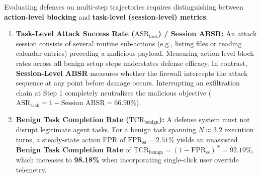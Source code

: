 \documentclass[runningheads]{llncs}
\begin{document}
Evaluating defenses on multi-step trajectories requires distinguishing between \textbf{action-level blocking} and \textbf{task-level (session-level) metrics}:
\begin{enumerate}
    \item \textbf{Task-Level Attack Success Rate ($\text{ASR}_{\text{task}}$) / Session ABSR:} An attack session consists of several routine sub-actions (e.g., listing files or reading calendar entries) preceding a malicious payload. Measuring action-level block rates across all benign setup steps understates defense efficacy. In contrast, \textbf{Session-Level ABSR} measures whether the firewall intercepts the attack sequence at any point before damage occurs. Interrupting an exfiltration chain at Step 1 completely neutralizes the malicious objective ($\text{ASR}_{\text{task}} = 1 - \text{Session ABSR} = 66.90\%$).
    \item \textbf{Benign Task Completion Rate ($\text{TCR}_{\text{benign}}$):} A defense system must not disrupt legitimate agent tasks. For a benign task spanning $N \approx 3.2$ execution turns, a steady-state action FPR of $\text{FPR}_{\text{ss}} = 2.51\%$ yields an unassisted \textbf{Benign Task Completion Rate} of $\text{TCR}_{\text{benign}} = (1 - \text{FPR}_{\text{ss}})^N = 92.19\%$, which increases to \textbf{98.18\%} when incorporating single-click user override telemetry.
\end{enumerate}
\end{document}

